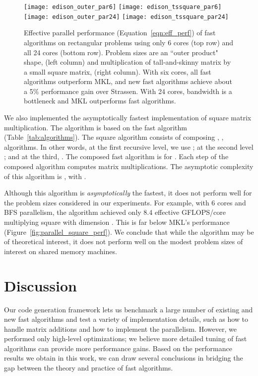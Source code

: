 \documentclass[preprint]{sigplanconf}
\begin{document}
\begin{figure*}[tb]
\centering
\texttt{[image: edison\_outer\_par6]}
\texttt{[image: edison\_tssquare\_par6]} \\
\texttt{[image: edison\_outer\_par24]}
\texttt{[image: edison\_tssquare\_par24]}
\caption{
Effective parallel performance (Equation~\eqref{eqn:eff_perf}) of fast algorithms on rectangular problems using only 6 cores (top row) and all 24 cores (bottom row).
Problem sizes are an ``outer product" shape,  (left column) and
multiplication of tall-and-skinny matrix by a small square matrix,  (right column).
With six cores, all fast algorithms outperform MKL, and new fast algorithms achieve about a 5\% performance gain over Strassen.
With 24 cores, bandwidth is a bottleneck and MKL outperforms fast algorithms.
}
\label{fig:parallel_nonsquare_perf}
\end{figure*}

We also implemented the asymptotically fastest implementation of square matrix multiplication.
The algorithm is based on the  fast algorithm (Table~\ref{tab:algorithms}).
The square algorithm consists of composing , ,  algorithms.
In other words, at the first recursive level, we use ; at the second level ; and at the third, .
The composed fast algorithm is for .
Each step of the composed algorithm computes  matrix multiplications.
The asymptotic complexity of this algorithm is , with .

Although this algorithm is \emph{asymptotically} the fastest, it does not perform well for the problem sizes considered in our experiments.
For example, with 6 cores and BFS parallelism, the algorithm achieved only 8.4 effective GFLOPS/core multiplying square with dimension .
This is far below MKL's performance (Figure~\ref{fig:parallel_square_perf}).
We conclude that while the algorithm may be of theoretical interest, it does not perform well on the modest problem sizes of interest on shared memory machines.








\section{Discussion}

Our code generation framework lets us benchmark a large number of existing and new fast algorithms and test a variety of implementation details, such as how to handle matrix additions and how to implement the parallelism.
However, we performed only high-level optimizations; we believe more detailed tuning of fast algorithms can provide more performance gains.
Based on the performance results we obtain in this work, we can draw several conclusions in bridging the gap between the theory and practice of fast algorithms. 
\end{document}
